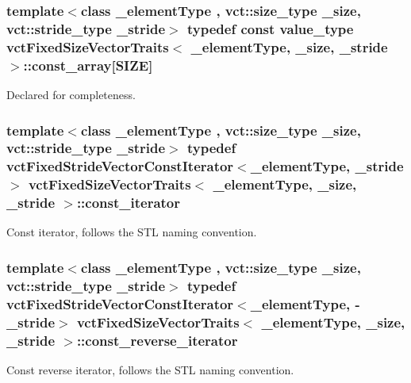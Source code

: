\subsubsection[{const\+\_\+array}]{\setlength{\rightskip}{0pt plus 5cm}template$<$class \+\_\+element\+Type , vct\+::size\+\_\+type \+\_\+size, vct\+::stride\+\_\+type \+\_\+stride$>$ typedef const value\+\_\+type {\bf vct\+Fixed\+Size\+Vector\+Traits}$<$ \+\_\+element\+Type, \+\_\+size, \+\_\+stride $>$\+::const\+\_\+array\mbox{[}{\bf S\+I\+Z\+E}\mbox{]}}\label{classvct_fixed_size_vector_traits_acb808c545eef4de1bdcd7b8c4f71b1ce}
Declared for completeness. \hypertarget{classvct_fixed_size_vector_traits_a9c7e38590e4a27350095e89a84dc0d09}{}
\subsubsection[{const\+\_\+iterator}]{\setlength{\rightskip}{0pt plus 5cm}template$<$class \+\_\+element\+Type , vct\+::size\+\_\+type \+\_\+size, vct\+::stride\+\_\+type \+\_\+stride$>$ typedef {\bf vct\+Fixed\+Stride\+Vector\+Const\+Iterator}$<$\+\_\+element\+Type, \+\_\+stride$>$ {\bf vct\+Fixed\+Size\+Vector\+Traits}$<$ \+\_\+element\+Type, \+\_\+size, \+\_\+stride $>$\+::{\bf const\+\_\+iterator}}\label{classvct_fixed_size_vector_traits_a9c7e38590e4a27350095e89a84dc0d09}
Const iterator, follows the S\+T\+L naming convention. \hypertarget{classvct_fixed_size_vector_traits_a66365350e5fae26c9cf29a3ce0bb4a60}{}
\subsubsection[{const\+\_\+reverse\+\_\+iterator}]{\setlength{\rightskip}{0pt plus 5cm}template$<$class \+\_\+element\+Type , vct\+::size\+\_\+type \+\_\+size, vct\+::stride\+\_\+type \+\_\+stride$>$ typedef {\bf vct\+Fixed\+Stride\+Vector\+Const\+Iterator}$<$\+\_\+element\+Type, -\/\+\_\+stride$>$ {\bf vct\+Fixed\+Size\+Vector\+Traits}$<$ \+\_\+element\+Type, \+\_\+size, \+\_\+stride $>$\+::{\bf const\+\_\+reverse\+\_\+iterator}}\label{classvct_fixed_size_vector_traits_a66365350e5fae26c9cf29a3ce0bb4a60}
Const reverse iterator, follows the S\+T\+L naming convention. \hypertarget{classvct_fixed_size_vector_traits_a4c4cff693ac7f81edfb240a208506309}{}
